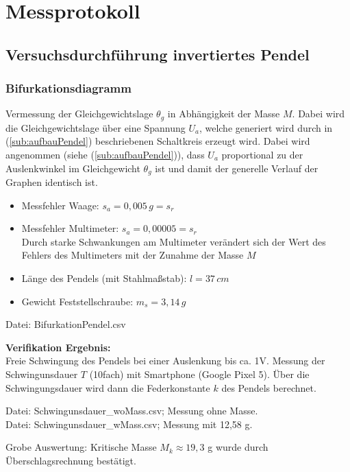 

\chapter{Messprotokoll}
\label{chap:protokoll}


\section{Versuchsdurchführung invertiertes Pendel}
\label{sec:versuchPendel}
\subsection*{Bifurkationsdiagramm}
\label{sub:bifu}
Vermessung der Gleichgewichtslage $\theta_g$ in Abhängigkeit der Masse $M$. Dabei wird die Gleichgewichtslage über eine Spannung $U_a$, welche generiert wird durch in (\ref{sub:aufbauPendel}) beschriebenen Schaltkreis erzeugt wird. Dabei wird angenommen (siehe (\ref{sub:aufbauPendel})), dass $U_a$ proportional zu der Auslenkwinkel im Gleichgewicht $\theta_g$ ist und damit der generelle Verlauf der Graphen identisch ist.
\begin{itemize}
\item Messfehler Waage: $s_a = 0,005\, g = s_r$
\item Messfehler Multimeter: $s_a = 0,00005 = s_r$\\
      Durch starke Schwankungen am Multimeter verändert sich der Wert des Fehlers des Multimeters mit der Zunahme der Masse $M$
\item Länge des Pendels (mit Stahlmaßstab): $l = 37 \, cm$
\item Gewicht Feststellschraube: $m_s = 3,14 \,g$
\end{itemize}
Datei: BifurkationPendel.csv

\textbf{Verifikation Ergebnis:}\\
Freie Schwingung des Pendels bei einer Auslenkung bis ca. 1V. Messung der Schwingunsdauer $T$ (10fach) mit Smartphone (Google Pixel 5). Über die Schwingungsdauer wird dann die Federkonstante $k$ des Pendels berechnet.

Datei: Schwingunsdauer\_woMass.csv; Messung ohne Masse.\\
Datei: Schwingunsdauer\_wMass.csv; Messung mit 12,58 g.

Grobe Auswertung: Kritische Masse $M_k\approx19,3$ g wurde durch Überschlagsrechnung bestätigt.

